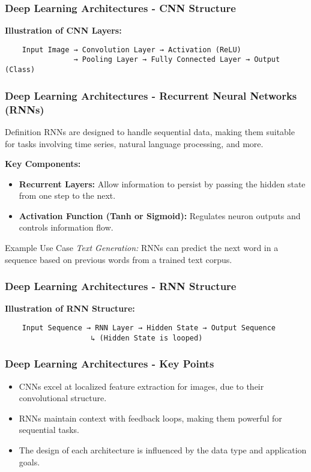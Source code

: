 \documentclass[aspectratio=169]{beamer}
\begin{document}
\begin{frame}[fragile]
    \frametitle{Deep Learning Architectures - CNN Structure}
    \begin{center}
    \textbf{Illustration of CNN Layers:}
    \end{center}
    \begin{lstlisting}
    Input Image → Convolution Layer → Activation (ReLU)
                → Pooling Layer → Fully Connected Layer → Output (Class)
    \end{lstlisting}
\end{frame}

\begin{frame}[fragile]
    \frametitle{Deep Learning Architectures - Recurrent Neural Networks (RNNs)}
    \begin{block}{Definition}
        RNNs are designed to handle sequential data, making them suitable for tasks involving time series, natural language processing, and more.
    \end{block}
    \textbf{Key Components:}
    \begin{itemize}
        \item \textbf{Recurrent Layers:} Allow information to persist by passing the hidden state from one step to the next.
        \item \textbf{Activation Function (Tanh or Sigmoid):} Regulates neuron outputs and controls information flow.
    \end{itemize}
    \begin{block}{Example Use Case}
        \textit{Text Generation:} RNNs can predict the next word in a sequence based on previous words from a trained text corpus.
    \end{block}
\end{frame}

\begin{frame}[fragile]
    \frametitle{Deep Learning Architectures - RNN Structure}
    \begin{center}
    \textbf{Illustration of RNN Structure:}
    \end{center}
    \begin{lstlisting}
    Input Sequence → RNN Layer → Hidden State → Output Sequence
                    ↳ (Hidden State is looped)
    \end{lstlisting}
\end{frame}

\begin{frame}[fragile]
    \frametitle{Deep Learning Architectures - Key Points}
    \begin{itemize}
        \item CNNs excel at localized feature extraction for images, due to their convolutional structure.
        \item RNNs maintain context with feedback loops, making them powerful for sequential tasks.
        \item The design of each architecture is influenced by the data type and application goals.
    \end{itemize}
\end{frame}
\end{document}

